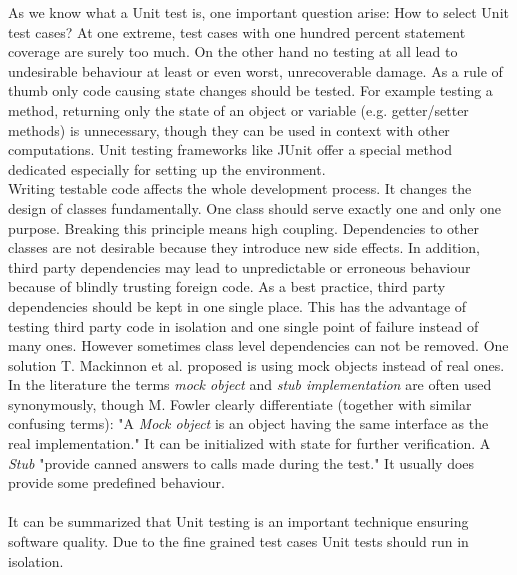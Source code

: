 \documentclass[12pt, notitlepage]{article}
\begin{document}
As we know what a Unit test is, one important question arise: How to select Unit test cases? At one extreme, test cases with one hundred percent statement coverage
are surely too much. On the other hand no testing at all lead to undesirable behaviour at least or even worst, unrecoverable damage. 
As a rule of thumb only code causing state changes should be tested. For example testing a method, returning only the state of an object or variable (e.g. getter/setter methods) is unnecessary, though they can be used in context with other computations. Unit testing frameworks 
like JUnit\cite{junit} offer a special method dedicated especially for setting up the environment.\\
Writing testable code affects the whole development process. It changes the design of classes fundamentally. One class should serve exactly one and only one purpose. Breaking this principle means high coupling. Dependencies to other classes are not desirable because they introduce new
side effects. In addition, third party dependencies may lead to unpredictable or erroneous behaviour because of blindly trusting foreign code.
As a best practice, third party dependencies should be kept in one single place. This has the advantage of testing third party code in isolation 
and one single point of failure instead of many ones. However sometimes class level dependencies can not be removed.
One solution T. Mackinnon et al.\cite{mock-objects} proposed is using mock objects instead of real ones. In the literature the terms \textit{mock object} and \textit{stub implementation} are often used synonymously, though M. Fowler clearly differentiate\cite{fowlermocks} (together with similar confusing terms): "A \textit{Mock object} is an object having the same interface as the real implementation." It can be initialized with state for further verification. 
A \textit{Stub} "provide canned answers to calls made during the test." It usually does provide some predefined behaviour.\\\\ 
It can be summarized that Unit testing is an important technique ensuring software quality. Due to the fine grained test cases Unit tests should run in isolation. 
\end{document}
